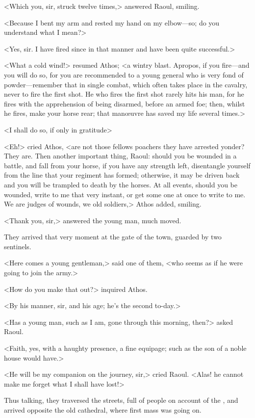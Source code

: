 <Which you, sir, struck twelve times,> answered Raoul, smiling.

<Because I bent my arm and rested my hand on my elbow—so; do you understand what I mean?>

<Yes, sir. I have fired since in that manner and have been quite successful.>

<What a cold wind!> resumed Athos; <a wintry blast. Apropos, if you fire—and you will do so, for you are recommended to a young general who is very fond of powder—remember that in single combat, which often takes place in the cavalry, never to fire the first shot. He who fires the first shot rarely hits his man, for he fires with the apprehension of being disarmed, before an armed foe; then, whilst he fires, make your horse rear; that manœuvre has saved my life several times.>

<I shall do so, if only in gratitude\longdash>

<Eh!> cried Athos, <are not those fellows poachers they have arrested yonder? They are. Then another important thing, Raoul: should you be wounded in a battle, and fall from your horse, if you have any strength left, disentangle yourself from the line that your regiment has formed; otherwise, it may be driven back and you will be trampled to death by the horses. At all events, should you be wounded, write to me that very instant, or get some one at once to write to me. We are judges of wounds, we old soldiers,> Athos added, smiling.

<Thank you, sir,> answered the young man, much moved.

They arrived that very moment at the gate of the town, guarded by two sentinels.

<Here comes a young gentleman,> said one of them, <who seems as if he were going to join the army.>

<How do you make that out?> inquired Athos.

<By his manner, sir, and his age; he's the second to-day.>

<Has a young man, such as I am, gone through this morning, then?> asked Raoul.

<Faith, yes, with a haughty presence, a fine equipage; such as the son of a noble house would have.>

<He will be my companion on the journey, sir,> cried Raoul. <Alas! he cannot make me forget what I shall have lost!>

Thus talking, they traversed the streets, full of people on account of the , and arrived opposite the old cathedral, where first mass was going on.

